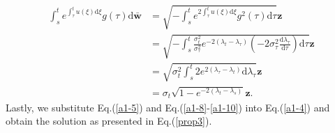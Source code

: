 \begin{align}
\int_s^te^{\int_\tau^tu(\xi)\mathrm{d}\xi}g(\tau)\mathrm{d}\bar{\boldsymbol{w}}
&=\sqrt{-\int_s^te^{2\int_\tau^tu(\xi)\mathrm{d}\xi}g^2(\tau)\mathrm{d}\tau}\boldsymbol{z} \nonumber\\
&=\sqrt{-\int_s^t\frac{\sigma^2_t}{\sigma^2_\tau}e^{-2(\lambda_t-\lambda_\tau)}\left(-2\sigma^2_{\tau}\frac{\mathrm{d}\lambda_\tau}{\mathrm{d}\tau}\right)\mathrm{d}\tau}\boldsymbol{z} \nonumber\\
&=\sqrt{\sigma^2_t\int_s^t 2e^{2(\lambda_\tau-\lambda_t)}\mathrm{d}\lambda_\tau}\boldsymbol{z} \nonumber\\
&=\sigma_t\sqrt{1-e^{-2(\lambda_t-\lambda_s)}}\boldsymbol{z}.
\label{a1-10}
\end{align}
Lastly, we substitute Eq.(\ref{a1-5}) and Eq.(\ref{a1-8}-\ref{a1-10}) into Eq.(\ref{a1-4}) and obtain the solution as presented in Eq.(\ref{prop3}).


